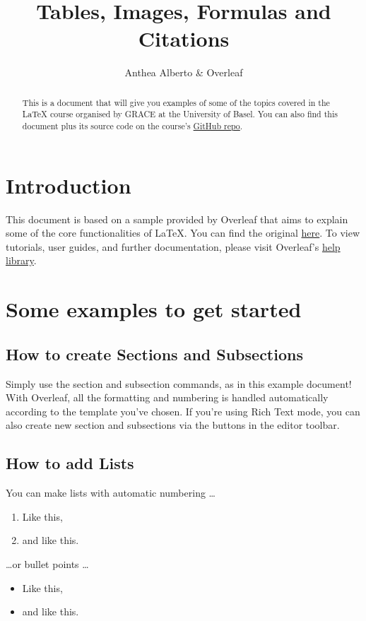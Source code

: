 \documentclass{article}
\title{Tables, Images, Formulas and Citations}
\author{Anthea Alberto \& Overleaf}
\date{} %
\begin{document}
\maketitle

\begin{abstract}
\noindent This is a document that will give you examples of some of the topics covered in the \LaTeX{} course organised by GRACE at the University of Basel. You can also find this document plus its source code on the course's \href{https://github.com/RISE-UNIBAS/grace_latex}{GitHub repo}.
\end{abstract}

\section{Introduction}

This document is based on a sample provided by Overleaf that aims to explain some of the core functionalities of \LaTeX{}. You can find the original \href{https://www.overleaf.com/latex/templates/example-project/qzykddzqhkwk}{here}. To view tutorials, user guides, and further documentation, please visit Overleaf's \href{https://www.overleaf.com/learn}{help library}.

\section{Some examples to get started}

\subsection{How to create Sections and Subsections}

Simply use the section and subsection commands, as in this example document! With Overleaf, all the formatting and numbering is handled automatically according to the template you've chosen. If you're using Rich Text mode, you can also create new section and subsections via the buttons in the editor toolbar.

\subsection{How to add Lists}

You can make lists with automatic numbering \dots

\begin{enumerate}
\item Like this,
\item and like this.
\end{enumerate}
\dots or bullet points \dots
\begin{itemize}
\item Like this,
\item and like this.
\end{itemize}
\end{document}
